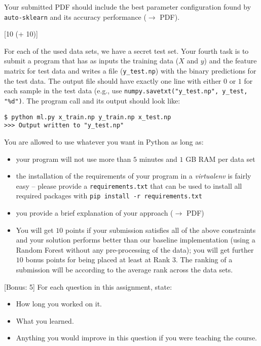 \documentclass{exam}
\begin{document}
\begin{questions}
Your submitted PDF should include the best parameter configuration found by \texttt{auto-sklearn} and its accuracy performance ($\to$ PDF).

[10 (+ 10)]

For each of the used data sets, we have a secret test set. Your fourth task is to submit a program that has as inputs the training data ($X$ and $y$) and the feature matrix for test data and writes a file (\texttt{y\_test.np}) with the binary predictions for the test data. The output file should have exactly one line with either $0$ or $1$ for each sample in the test data (e.g., use \texttt{numpy.savetxt("y\_test.np", y\_test, "\%d")}.
The program call and its output should look like:

\begin{verbatim}
$ python ml.py x_train.np y_train.np x_test.np 
>>> Output written to "y_test.np"
\end{verbatim} 

You are allowed to use whatever you want in Python as long as:

\begin{itemize}
  \item your program will not use more than $5$ minutes and $1$ GB RAM per data set
  \item the installation of the requirements of your program in a \emph{virtualenv} is fairly easy -- please provide a \texttt{requirements.txt} that can be used to install all required packages with \texttt{pip install -r requirements.txt}
  \item you provide a brief explanation of your approach ($\to$ PDF)
  \item You will get $10$ points if your submission satisfies all of the above constraints and your solution performs better than our baseline implementation (using a Random Forest without any pre-processing of the data); you will get further $10$ bonus points for being placed at least at Rank $3$. The ranking of a submission will be according to the average rank across the data sets.
\end{itemize} 

[Bonus: 5]
For each question in this assignment, state:
\begin{itemize}
	\item How long you worked on it.
	\item What you learned.
	\item Anything you would improve in this question if you were teaching the course.
\end{itemize}

\end{questions}
\end{document}
